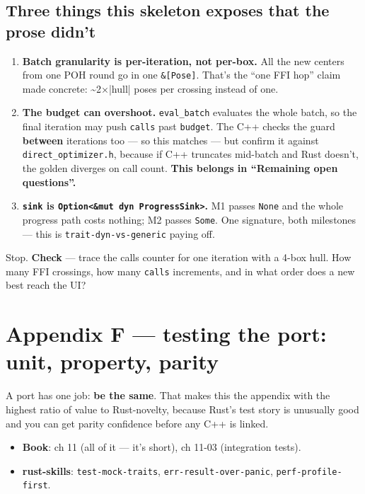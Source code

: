 \documentclass[11pt]{article}
\begin{document}
\subsection{Three things this skeleton exposes that the prose didn't}
\label{sec:orgf09a45a}

\begin{enumerate}
\item \textbf{\textbf{Batch granularity is per-iteration, not per-box.}} All the new centers
from one POH round go in one \texttt{\&[Pose]}. That's the ``one FFI hop'' claim made
concrete: \textasciitilde{}2×|hull| poses per crossing instead of one.
\item \textbf{\textbf{The budget can overshoot.}} \texttt{eval\_batch} evaluates the whole batch, so the
final iteration may push \texttt{calls} past \texttt{budget}. The C++ checks the guard
\textbf{between} iterations too — so this matches — but confirm it against
\texttt{direct\_optimizer.h}, because if C++ truncates mid-batch and Rust doesn't,
the golden diverges on call count. \textbf{\textbf{This belongs in ``Remaining open
questions''.}}
\item \textbf{\textbf{\texttt{sink} is \texttt{Option<\&mut dyn ProgressSink>}.}} M1 passes \texttt{None} and the
whole progress path costs nothing; M2 passes \texttt{Some}. One signature, both
milestones — this is \texttt{trait-dyn-vs-generic} paying off.
\end{enumerate}

Stop. \textbf{\textbf{Check}} — trace the calls counter for one iteration with a 4-box hull.
How many FFI crossings, how many \texttt{calls} increments, and in what order does a
new best reach the UI?
\section{Appendix F — testing the port: unit, property, parity}
\label{sec:org30a290e}

A port has one job: \textbf{be the same}. That makes this the appendix with the
highest ratio of value to Rust-novelty, because Rust's test story is unusually
good and you can get parity confidence before any C++ is linked.

\begin{itemize}
\item \textbf{\textbf{Book}}: ch 11 (all of it — it's short), ch 11-03 (integration tests).
\item \textbf{\textbf{rust-skills}}: \texttt{test-mock-traits}, \texttt{err-result-over-panic},
\texttt{perf-profile-first}.
\end{itemize}
\end{document}
